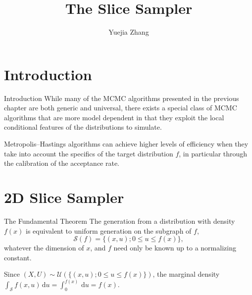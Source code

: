 \documentclass{beamer}
\title{The Slice Sampler}
\author{Yuejia Zhang}
\begin{document}
	\begin{frame}[plain]
		\maketitle
	\end{frame}
\section{Introduction}
	\begin{frame}{Introduction}
		While many of the MCMC algorithms presented in the previous chapter are
		both generic and universal, there exists a special class of MCMC
		algorithms that are more model dependent in that they exploit 
		the local conditional features of the distributions to simulate.
		
		Metropolis--Hastings algorithms can achieve higher levels of efficiency when
		they take into account the specifics of the target distribution $f$, in particular
		through the calibration of the acceptance rate.
	\end{frame}
\section{2D Slice Sampler}
	\begin{frame}{The Fundamental Theorem}
		The generation from a distribution with density
		$f(x)$ is equivalent to uniform generation on the subgraph of $f$,
		$$
		\mathscr{S}(f)=\{(x, u) ; 0 \leq u \leq f(x)\},
		$$
		whatever the dimension of $x$, and $f$ need only be known up to a normalizing constant.
		
		\vspace{0.5cm}
		
		Since $(X, U) \sim \mathcal{U}(\{(x, u) ; 0 \leq u \leq f(x)\})$,
		the marginal density $\int_{\mathscr{S}} f(x, u) \, \mathrm{d} u = \int_0^{f(x)} \, \mathrm{d} u = f(x)$.
	\end{frame}
\end{document}
